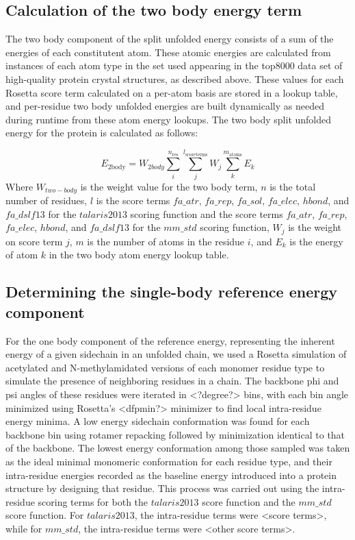 \subsection{Calculation of the two body energy term}
The two body component of the split unfolded energy consists of a sum of the energies of each constitutent atom. These atomic energies are calculated from instances of each atom type in the set used appearing in the top8000 data set of high-quality protein crystal structures, as described above. These values for each Rosetta score term calculated on a per-atom basis are stored in a lookup table, and per-residue two body unfolded energies are built dynamically as needed during runtime from these atom energy lookups. The two body split unfolded energy for the protein is calculated as follows:

\begin{equation}
E_{\text{2body}} = W_{2body} \sum_{i}^{n_{\text{res}}} \sum_{j}^{l_{\text{scoreterms}}} W_{j} \sum_{k}^{m_{\text{atoms}}} E_{k}
\end{equation}
Where $W_{two-body}$ is the weight value for the two body term, $n$ is the total number of residues, $l$ is the score terms $fa\_atr$, $fa\_rep$, $fa\_sol$, $fa\_elec$, $hbond$, and $fa\_dslf13$ for the $talaris2013$ scoring function and the score terms $fa\_atr$, $fa\_rep$, $fa\_elec$, $hbond$, and $fa\_dslf13$ for the $mm\_std$ scoring function, $W_{j}$ is the weight on score term $j$, $m$ is the number of atoms in the residue $i$, and $E_{k}$ is the energy of atom $k$ in the two body atom energy lookup table.


\subsection{Determining the single-body reference energy component}
For the one body component of the reference energy, representing the inherent energy of a given sidechain in an unfolded chain, we used a Rosetta simulation of acetylated and N-methylamidated versions of each monomer residue type to simulate the presence of neighboring residues in a chain. The backbone phi and psi angles of these residues were iterated in <?degree?> bins, with each bin angle minimized using Rosetta's <dfpmin?> minimizer to find local intra-residue energy minima. A low energy sidechain conformation was found for each backbone bin using rotamer repacking followed by minimization identical to that of the backbone. The lowest energy conformation among those sampled was taken as the ideal minimal monomeric conformation for each residue type, and their intra-residue energies recorded as the baseline energy introduced into a protein structure by designing that residue. This process was carried out using the intra-residue scoring terms for both the $talaris2013$ score function and the $mm\_std$ score function. For $talaris2013$, the intra-residue terms were <score terms>, while for $mm\_std$, the intra-residue terms were <other score terms>.

